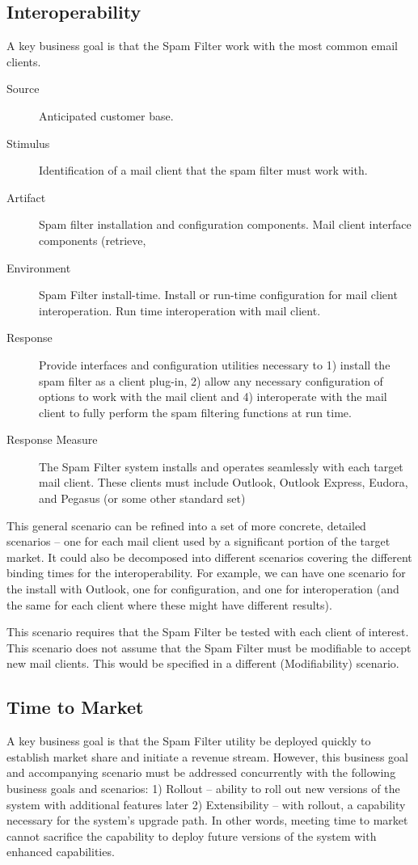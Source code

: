 \documentclass[letterpaper,11pt]{article}
\begin{document}
\subsection{Interoperability}
\label{app:interop}
A key business goal is that the Spam Filter work with the most common email
clients.
\begin{description} 
\item[Source] Anticipated customer base.
\item[Stimulus] Identification of a mail client that the spam filter must work
  with.
\item[Artifact] Spam filter installation and configuration components. Mail
  client interface components (retrieve,
\item[Environment] Spam Filter install-time. Install or run-time configuration
  for mail client interoperation. Run time interoperation with mail client.
\item[Response] Provide interfaces and configuration utilities necessary to 1)
  install the spam filter as a client plug-in, 2) allow any necessary
  configuration of options to work with the mail client and 4) interoperate
  with the mail client to fully perform the spam filtering functions at run
  time.
\item[Response Measure] The Spam Filter system installs and operates
  seamlessly with each target mail client. These clients must include Outlook,
  Outlook Express, Eudora, and Pegasus (or some other standard set)
\end{description}
 
This general scenario can be refined into a set of more concrete, detailed
scenarios – one for each mail client used by a significant portion of the
target market. It could also be decomposed into different scenarios covering
the different binding times for the interoperability. For example, we can have
one scenario for the install with Outlook, one for configuration, and one for
interoperation (and the same for each client where these might have different
results).
 
This scenario requires that the Spam Filter be tested with each client of
interest. This scenario does not assume that the Spam Filter must be
modifiable to accept new mail clients. This would be specified in a different
(Modifiability) scenario.

\subsection{Time to Market}
\label{app:ttm}
A key business goal is that the Spam Filter utility be deployed quickly to
establish market share and initiate a revenue stream. However, this business
goal and accompanying scenario must be addressed concurrently with the
following business goals and scenarios: 1) Rollout – ability to roll out new
versions of the system with additional features later 2) Extensibility – with
rollout, a capability necessary for the system’s upgrade path. In other words,
meeting time to market cannot sacrifice the capability to deploy future
versions of the system with enhanced capabilities.
\end{document}
